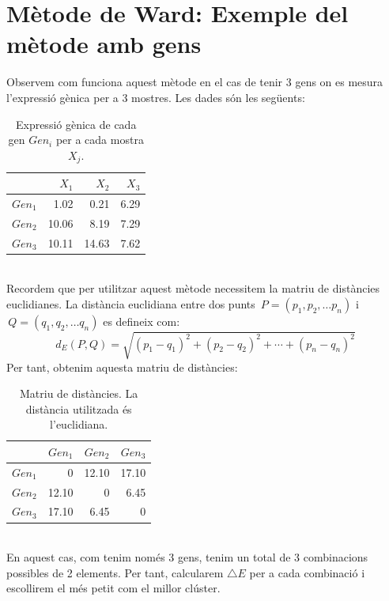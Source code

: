 \documentclass[english]{article}
\begin{document}
\section{Mètode de Ward: Exemple del mètode amb gens}
\label{annex:a}
Observem com funciona aquest mètode en el cas de tenir 3 gens on es mesura l'expressió gènica per a 3 mostres. Les dades són les següents:
\begin{table}[ht]
\centering
\begin{tabular}{rrrr}
\hline
& $X_{1}$ & $X_2$ & $X_3$ \\
\hline
$Gen_1$ & 1.02 & 0.21 & 6.29 \\
$Gen_2$ & 10.06 & 8.19 & 7.29 \\
$Gen_3$ & 10.11 & 14.63 & 7.62 \\
\hline
\end{tabular}
\caption{Expressió gènica de cada gen $Gen_i$ per a cada mostra $X_j$.}
\end{table}
\\
Recordem que per utilitzar aquest mètode necessitem la matriu de distàncies euclidianes. La distància euclidiana entre dos punts ${\displaystyle \,P=(p_{1},p_{2},\dots p_{n})}$ i $ {\displaystyle \,Q=(q_{1},q_{2},\dots q_{n})}$ es defineix com:
\begin{equation*}
{\displaystyle d_{E}(P,Q)={\sqrt {(p_{1}-q_{1})^{2}+(p_{2}-q_{2})^{2}+\cdots +(p_{n}-q_{n})^{2}}}}
\end{equation*}
Per tant, obtenim aquesta matriu de distàncies:
\begin{table}[ht]
\centering
\begin{tabular}{rrrr}
\hline
& $Gen_1$ & $Gen_2$ & $Gen_3$ \\
\hline
$Gen_1$ & 0 & 12.10 & 17.10 \\
$Gen_2$ & 12.10 & 0 & 6.45 \\
$Gen_3$ & 17.10 & 6.45 & 0 \\
\hline
\end{tabular}
\caption{Matriu de distàncies. La distància utilitzada és l'euclidiana.}
\end{table}
\\
En aquest cas, com tenim només 3 gens, tenim un total de 3 combinacions possibles de 2 elements. Per tant, calcularem $\bigtriangleup E$ per a cada combinació i escollirem el més petit com el millor clúster.
\\
\end{document}
